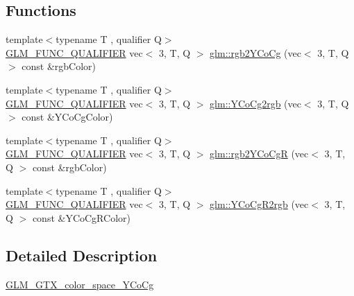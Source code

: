 \subsection*{Functions}
\begin{DoxyCompactItemize}
\item 
{\footnotesize template$<$typename T , qualifier Q$>$ }\\\mbox{\hyperlink{setup_8hpp_a33fdea6f91c5f834105f7415e2a64407}{G\+L\+M\+\_\+\+F\+U\+N\+C\+\_\+\+Q\+U\+A\+L\+I\+F\+I\+ER}} vec$<$ 3, T, Q $>$ \mbox{\hyperlink{group__gtx__color__space___y_co_cg_ga0606353ec2a9b9eaa84f1b02ec391bc5}{glm\+::rgb2\+Y\+Co\+Cg}} (vec$<$ 3, T, Q $>$ const \&rgb\+Color)
\item 
{\footnotesize template$<$typename T , qualifier Q$>$ }\\\mbox{\hyperlink{setup_8hpp_a33fdea6f91c5f834105f7415e2a64407}{G\+L\+M\+\_\+\+F\+U\+N\+C\+\_\+\+Q\+U\+A\+L\+I\+F\+I\+ER}} vec$<$ 3, T, Q $>$ \mbox{\hyperlink{group__gtx__color__space___y_co_cg_ga163596b804c7241810b2534a99eb1343}{glm\+::\+Y\+Co\+Cg2rgb}} (vec$<$ 3, T, Q $>$ const \&Y\+Co\+Cg\+Color)
\item 
{\footnotesize template$<$typename T , qualifier Q$>$ }\\\mbox{\hyperlink{setup_8hpp_a33fdea6f91c5f834105f7415e2a64407}{G\+L\+M\+\_\+\+F\+U\+N\+C\+\_\+\+Q\+U\+A\+L\+I\+F\+I\+ER}} vec$<$ 3, T, Q $>$ \mbox{\hyperlink{group__gtx__color__space___y_co_cg_ga0389772e44ca0fd2ba4a79bdd8efe898}{glm\+::rgb2\+Y\+Co\+CgR}} (vec$<$ 3, T, Q $>$ const \&rgb\+Color)
\item 
{\footnotesize template$<$typename T , qualifier Q$>$ }\\\mbox{\hyperlink{setup_8hpp_a33fdea6f91c5f834105f7415e2a64407}{G\+L\+M\+\_\+\+F\+U\+N\+C\+\_\+\+Q\+U\+A\+L\+I\+F\+I\+ER}} vec$<$ 3, T, Q $>$ \mbox{\hyperlink{group__gtx__color__space___y_co_cg_gaf8d30574c8576838097d8e20c295384a}{glm\+::\+Y\+Co\+Cg\+R2rgb}} (vec$<$ 3, T, Q $>$ const \&Y\+Co\+Cg\+R\+Color)
\end{DoxyCompactItemize}


\subsection{Detailed Description}
\mbox{\hyperlink{group__gtx__color__space___y_co_cg}{G\+L\+M\+\_\+\+G\+T\+X\+\_\+color\+\_\+space\+\_\+\+Y\+Co\+Cg}} 